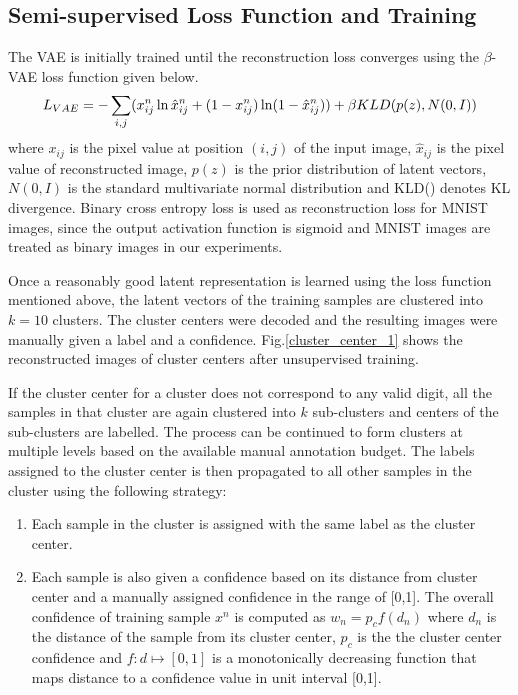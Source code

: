 \documentclass[runningheads]{llncs}
\begin{document}
\subsection{Semi-supervised Loss Function and Training}\label{section_loss_function}
The VAE is initially trained until the reconstruction loss converges using the $\beta$-VAE loss function\cite{beta_vae} given below.
\begin{equation} \label{vae_loss_eqn}
L_{VAE} = -\sum_{i, j}(x_{ij}^n \ln \hat{x}_{ij}^n
+ (1 - x_{ij}^n) \ln(1 -  \hat{x}_{ij}^n ) )\\
    +\beta KLD(p(z), N(0,I))
\end{equation}
where   $x_{ij}$ is the pixel value at position $(i, j)$ of the input image, $\hat{x}_{ij}$ is the pixel value of reconstructed image, $p(z)$ is the prior distribution of latent vectors, $N(0,I)$ is the standard multivariate normal distribution and KLD() denotes KL divergence.
Binary cross entropy loss is used as reconstruction loss for MNIST images, since the output activation function is sigmoid and MNIST images are treated as binary images in our experiments.

Once a reasonably good latent representation is learned using the loss function mentioned above, the latent vectors of the training samples are clustered into $k=10$ clusters.
The cluster centers were decoded and the resulting images were manually given a label and a confidence.
Fig.\ref{cluster_center_1} shows the reconstructed images of cluster centers after unsupervised training.

If the cluster center for a cluster does not correspond to any valid digit, all the samples in that cluster are again clustered into $k$ sub-clusters and  centers of the sub-clusters are labelled.
The process can be continued to form clusters at multiple levels based on the available manual annotation budget.
The labels assigned to the cluster center is then propagated to all other samples in the cluster using the following strategy:
\begin{enumerate}
    \item Each sample in the cluster is assigned with the  same label as the cluster center.
    \item Each sample is also given a confidence based on its distance from cluster center and  a manually assigned confidence in the range of [0,1]. The overall confidence of  training sample $x^n$ is computed as $w_n = p_cf(d_n)$
where $d_n$ is the distance of the sample from its cluster center, $p_c$  is the the cluster center confidence  and $f: d \mapsto [0,1]$ is a monotonically decreasing function that maps distance to a confidence value in unit interval [0,1].
\end{enumerate}
\end{document}
